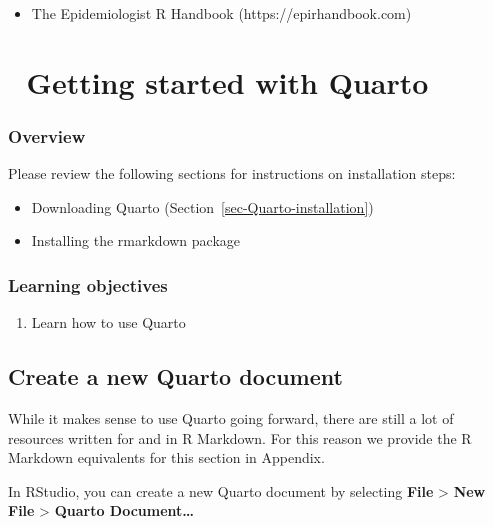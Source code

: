 \documentclass[
  letterpaper,
  DIV=11,
  numbers=noendperiod]{scrreprt}
\providecommand{\tightlist}{%
  \setlength{\itemsep}{0pt}\setlength{\parskip}{0pt}}\usepackage{longtable,booktabs,array}
\begin{document}
\begin{itemize}
\tightlist
\item
  The Epidemiologist R Handbook (https://epirhandbook.com)
\end{itemize}

\hypertarget{getting-started-with-quarto}{%
\chapter{\texorpdfstring{{📘} Getting started with
Quarto}{📘 Getting started with Quarto}}\label{getting-started-with-quarto}}

\hypertarget{overview-4}{%
\subsection{Overview}\label{overview-4}}

Please review the following sections for instructions on installation
steps:

\begin{itemize}
\tightlist
\item
  Downloading Quarto (Section~\ref{sec-Quarto-installation})
\item
  Installing the rmarkdown package
\end{itemize}

\hypertarget{learning-objectives-5}{%
\subsection{Learning objectives}\label{learning-objectives-5}}

\begin{enumerate}
\def\labelenumi{\arabic{enumi}.}
\tightlist
\item
  Learn how to use Quarto
\end{enumerate}

\hypertarget{create-a-new-quarto-document}{%
\section{Create a new Quarto
document}\label{create-a-new-quarto-document}}

While it makes sense to use Quarto going forward, there are still a lot
of resources written for and in R Markdown. For this reason we provide
the R Markdown equivalents for this section in Appendix.

In RStudio, you can create a new Quarto document by selecting
\textbf{File} \textgreater{} \textbf{New File} \textgreater{}
\textbf{Quarto Document\ldots{}}
\end{document}
